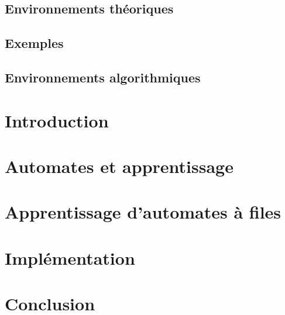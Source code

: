 

\newcommand{\student}{Benjamin André}
\newcommand{\grade}{MAB2 Sciences Informatiques}
\newcommand{\director}{Véronique Bruyère}
\renewcommand{\title}{Vérification de la sécurité d'automates à file par apprentissage actif}
\renewcommand{\date}{\today}



	

	\tableofcontents
	\newpage

	\section*{Environnements théoriques}

	\section*{Exemples}

	\section*{Environnements algorithmiques}

	\newpage


	\chapter{Introduction}\label{intro}
	\chapter{Automates et apprentissage}\label{pre}
	\chapter{Apprentissage d'automates à files}\label{pro}
	\chapter{Implémentation}\label{impl}
	\chapter{Conclusion}\label{ccl}

